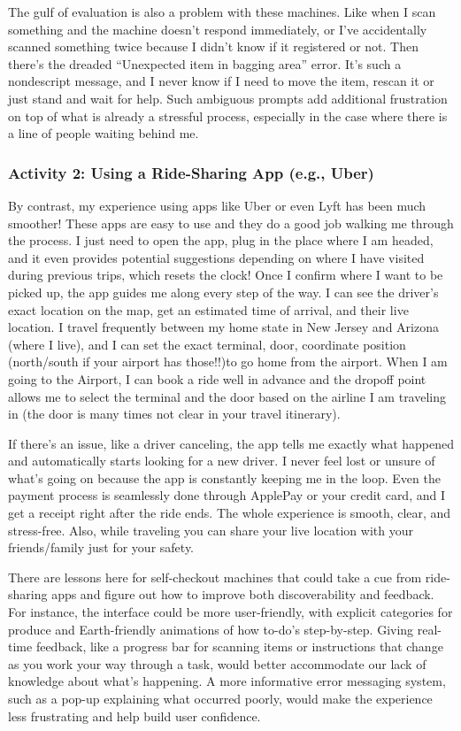 \documentclass[
	letterpaper, %
]{jdf}
\begin{document}
The gulf of evaluation is also a problem with these machines.  Like when I scan something and the machine doesn’t respond immediately, or I’ve accidentally scanned something twice because I didn’t know if it registered or not. Then there’s the dreaded “Unexpected item in bagging area” error. It’s such a nondescript message, and I never know if I need to move the item, rescan it or just stand and wait for help. Such ambiguous prompts add additional frustration on top of what is already a stressful process, especially in the case where there is a line of people waiting behind me.

\subsubsection {Activity 2: Using a Ride-Sharing App (e.g., Uber)}
By contrast, my experience using apps like Uber or even Lyft has been much smoother! These apps are easy to use and they do a good job walking me through the process. I just need to open the app, plug in the place where I am headed, and it even provides potential suggestions depending on where I have visited during previous trips, which resets the clock! Once I confirm where I want to be picked up, the app guides me along every step of the way. I can see the driver’s exact location on the map, get an estimated time of arrival, and their live location. I travel frequently between my home state in New Jersey and Arizona (where I live), and I can set the exact terminal, door, coordinate position (north/south if your airport has those!!)to go home from the airport. When I am going to the Airport, I can book a ride well in advance and the dropoff point allows me to select the terminal and the door based on the airline I am traveling in (the door is many times not clear in your travel itinerary).

If there’s an issue, like a driver canceling, the app tells me exactly what happened and automatically starts looking for a new driver. I never feel lost or unsure of what’s going on because the app is constantly keeping me in the loop. Even the payment process is seamlessly done through ApplePay or your credit card, and I get a receipt right after the ride ends. The whole experience is smooth, clear, and stress-free. Also, while traveling you can share your live location with your friends/family just for your safety. 

There are lessons here for self-checkout machines that could take a cue from ride-sharing apps and figure out how to improve both discoverability and feedback. For instance, the interface could be more user-friendly, with explicit categories for produce and Earth-friendly animations of how to-do's step-by-step. Giving real-time feedback, like a progress bar for scanning items or instructions that change as you work your way through a task, would better accommodate our lack of knowledge about what’s happening. A more informative error messaging system, such as a pop-up explaining what occurred poorly, would make the experience less frustrating and help build user confidence.
\newpage
\end{document}
